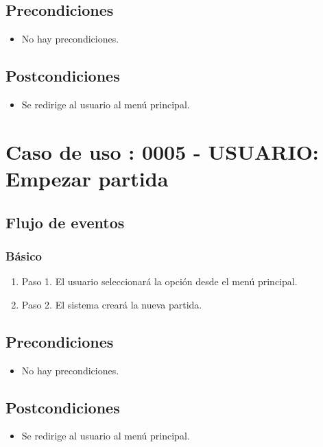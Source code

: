 \subsection{Precondiciones}
\begin{itemize}
\item No hay precondiciones.
\end{itemize}

\subsection{Postcondiciones}
\begin{itemize}
\item Se redirige al usuario al menú principal.
\end{itemize}



\section{Caso de uso : 0005 - USUARIO: Empezar partida}\label{sec:uc0}
\subsection{Flujo de eventos}
\subsubsection{Básico}

\begin{enumerate}
\item Paso 1.
El usuario seleccionará la opción desde el menú principal.
\item Paso 2.
El sistema creará la nueva partida.
\end{enumerate}

\subsection{Precondiciones}
\begin{itemize}
\item No hay precondiciones.
\end{itemize}

\subsection{Postcondiciones}
\begin{itemize}
\item Se redirige al usuario al menú principal.
\end{itemize}



